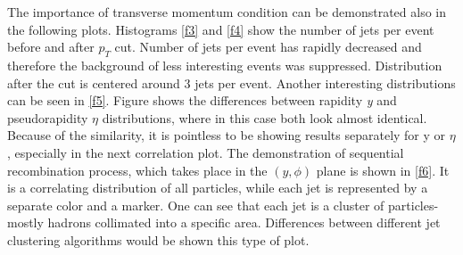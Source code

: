 \documentclass[a4paper,10pt]{article}
\begin{document}
\noindent The importance of transverse momentum condition can be demonstrated also in the following plots. Histograms \autoref{f3} and \autoref{f4} show the number of jets per event before and after $p_T$ cut. Number of jets per event has rapidly decreased and therefore the background of less interesting events was suppressed. Distribution after the cut is centered around 3 jets per event. Another interesting distributions can be seen in \autoref{f5}. Figure shows the differences between rapidity \textit{y} and pseudorapidity $\eta$ distributions, where in this case both look almost identical. Because of the similarity, it is pointless to be showing results separately for y or $\eta$, especially in the next correlation plot. 
\newline
\noindent The demonstration of sequential recombination process, which takes place in the $(y,\phi)$ plane is shown in \autoref{f6}. It is a correlating distribution of all particles, while each jet is represented by a separate color and a marker. One can see that each jet is a cluster of particles- mostly hadrons collimated into a specific area. Differences between different jet clustering algorithms would be shown this type of plot.
\end{document}

